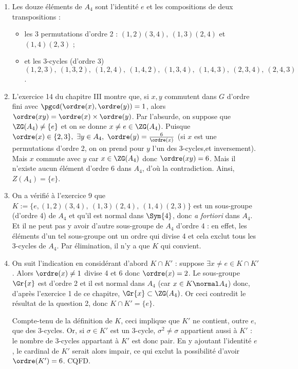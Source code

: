 \begin{enumerate}
 \item Les douze éléments de $A_4$ sont l'identité $e$ et les compositions de deux transpositions :
 \begin{itemize}
  \item les 3 permutations d'ordre 2 : $(1,2)(3,4),~ (1,3)(2,4)$ et $(1,4)(2,3)$ ;
  \item et les 3-cycles (d'ordre 3) $(1,2,3),~ (1,3,2),~ (1,2,4),~ (1,4,2),~ (1,3,4),~ (1,4,3),~ (2,3,4),~ (2,4,3)$.
 \end{itemize}
\item L'exercice 14 du chapitre III montre que, si $x,y$ commutent dans $G$ d'ordre fini avec $\pgcd(\ordre(x), \ordre(y))=1$, alors $\ordre(xy) = \ordre(x)\times \ordre(y)$. Par l'absurde, on suppose que $\ZG(A_4)\neq \{e\}$ et on se donne $x\neq e \in \ZG(A_4)$. Puisque $\ordre(x)\in \{2,3\},~ \exists y\in A_4,~ \ordre(y) = \frac{6}{\ordre(x)}$ (si $x$ est une permutations d'ordre 2, on on prend pour $y$ l'un des 3-cycles,et inversement). Mais $x$ commute avec $y$ car $x\in \ZG(A_4)$ donc $\ordre(xy) =6$. Mais il n'existe aucun élément d'ordre 6 dans $A_4$, d'où la contradiction. Ainsi,~ $Z(A_4) = \{e\}$.
\item On a vérifié à l'exercice 9 que $K:=\{e,(1,2)(3,4),~ (1,3)(2,4),~(1,4)(2,3) \}$ est un sous-groupe (d'ordre 4) de $A_4$ et qu'il est normal dans $\Sym{4}$, donc \textit{a fortiori} dans $A_4$. Et il ne peut pas y avoir d'autre sous-groupe de $A_4$ d'ordre 4 : en effet, les éléments d'un tel sous-groupe ont un ordre qui divise 4 et cela exclut tous les 3-cycles de $A_4$. Par élimination, il n'y a que $K$ qui convient.
\item On suit l'indication en considérant d'abord $K\cap K'$ : suppose $\exists x\neq e\in K\cap K'$. Alors $\ordre(x)\neq 1$ divise 4 et 6 donc $\ordre(x) = 2$. Le sous-groupe $\Gr{x}$ est d'ordre 2 et il est normal dans $A_4$ (car $x\in K\normal A_4$) donc, d'après l'exercice 1 de ce chapitre, $\Gr{x} \subset \ZG(A_4)$. Or ceci contredit le résultat de la question 2, donc $K\cap K'=\{e\}$.

Compte-tenu de la définition de $K$, ceci implique que $K'$ ne contient, outre $e$, que des 3-cycles. Or, si $\sigma \in K'$ est un 3-cycle, $\sigma^2 \neq \sigma$ appartient aussi à $K'$ : le nombre de 3-cycles appartant à $K'$ est donc pair.
En y ajoutant l'identité $e$, le cardinal de $K'$ serait alors impair, ce qui exclut la possibilité d'avoir $\ordre(K') = 6$. CQFD.
\end{enumerate}
